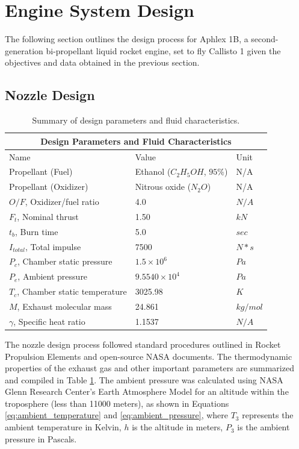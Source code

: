\documentclass[9pt]{article} %
\numberwithin{equation}{section} %
\begin{document}
\section{Engine System Design}
\hspace{\parindent} The following section outlines the design process for Aphlex 1B, a second-generation bi-propellant liquid rocket engine, set to fly Callisto 1 given the objectives and data obtained in the previous section.

\subsection{Nozzle Design} \label{sec:nozzle_design}

\begin{table}[!htb]
\centering
\begin{tabular}{ |p{6cm}||p{4cm}|p{2cm}|  }
\hline
\multicolumn{3}{|c|}{Design Parameters and Fluid Characteristics} \\
\hline
Name & Value & Unit \\
\hline
Propellant (Fuel)  &  Ethanol ($C_{2}H_{5}OH$, $95\%$)   &  N/A  \\
Propellant (Oxidizer)  &  Nitrous oxide ($N_{2}O$) & N/A  \\
$O/F$, Oxidizer/fuel ratio &  4.0  &  $N/A$ \\
$F_{t}$, Nominal thrust &  1.50 &  $kN$ \\
$t_{b}$, Burn time  &  5.0 & $sec$ \\
$I_{total}$, Total impulse & 7500 & $N * s$\\
$P_{c}$, Chamber static pressure &  $1.5 \times 10^{6}$  &  $Pa$  \\
$P_{e}$, Ambient pressure &  $9.5540 \times 10^{4}$  &  $Pa$ \\
$T_{c}$, Chamber static temperature &  3025.98  &  $K$ \\
$M$, Exhaust molecular mass &  24.861  &  $kg/mol$  \\
$\gamma$, Specific heat ratio  &  1.1537  &  $N/A$ \\
\hline
\end{tabular}
\caption{Summary of design parameters and fluid characteristics.}
\label{table:gas_parameters}
\end{table}

The nozzle design process followed standard procedures outlined in Rocket Propulsion Elements \cite{rpe} and open-source NASA documents. The thermodynamic properties of the exhaust gas and other important parameters are summarized and compiled in Table \ref{table:gas_parameters}. The ambient pressure was calculated using NASA Glenn Research Center's Earth Atmosphere Model for an altitude within the troposphere (less than 11000 meters), as shown in Equations \ref{eq:ambient_temperature} and \ref{eq:ambient_pressure}, where $T_{3}$ represents the ambient temperature in Kelvin, $h$ is the altitude in meters, $P_{3}$ is the ambient pressure in Pascals.
\end{document}

